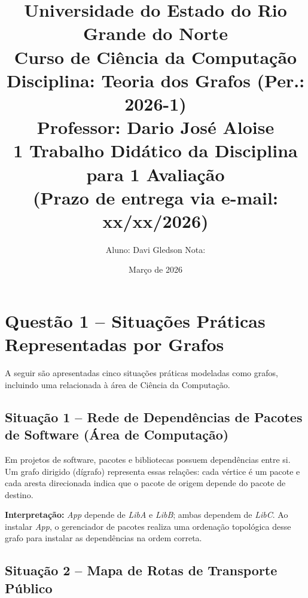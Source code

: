 \documentclass[12pt,a4paper]{article}
\title{
  \large \textbf{Universidade do Estado do Rio Grande do Norte}\\[0.3cm]
  \large Curso de Ciência da Computação\\[0.3cm]
  \large Disciplina: Teoria dos Grafos (Per.: 2026-1)\\[0.3cm]
  \large Professor: Dario José Aloise\\[0.8cm]
  \Large \textbf{1\textordmasculine{} Trabalho Didático da Disciplina para 1\textordfeminine{} Avaliação}\\[0.3cm]
  \normalsize (Prazo de entrega via e-mail: xx/xx/2026)
}
\author{
  Aluno: Davi Gledson \hspace{3cm} Nota: \underline{\hspace{3cm}}
}
\date{Março de 2026}
\begin{document}
\maketitle
\thispagestyle{empty}

\tableofcontents
\newpage

\section{Questão 1 -- Situações Práticas Representadas por Grafos}

A seguir são apresentadas cinco situações práticas modeladas como grafos, incluindo uma relacionada à área de Ciência da Computação.

\subsection{Situação 1 -- Rede de Dependências de Pacotes de Software (Área de Computação)}

Em projetos de software, pacotes e bibliotecas possuem dependências entre si. Um grafo dirigido (dígrafo) representa essas relações: cada vértice é um pacote e cada aresta direcionada indica que o pacote de origem depende do pacote de destino.

\begin{center}
\end{center}

\noindent\textbf{Interpretação:} \textit{App} depende de \textit{LibA} e \textit{LibB}; ambas dependem de \textit{LibC}. Ao instalar \textit{App}, o gerenciador de pacotes realiza uma ordenação topológica desse grafo para instalar as dependências na ordem correta.

\subsection{Situação 2 -- Mapa de Rotas de Transporte Público}
\end{document}
